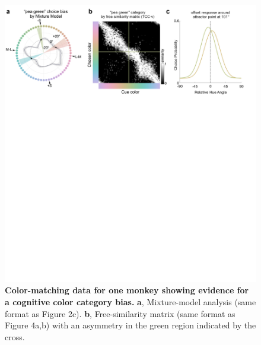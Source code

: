 \documentclass[9pt,biorxiv,lineno,onehalfspacing]{lapreprint}
\begin{document}
\begin{refsection}
\begin{figure}
    \begin{fullwidth}
    \centering
    \includegraphics[width=\textwidth+4cm,trim={0 18cm 0 0},clip]{Outputs/Paper/Figures/flat/F5_CastorCogBias_7.png}
    \caption{\textbf {Color-matching data for one monkey showing evidence for a cognitive color category bias.} 
    \textbf{a}, Mixture-model analysis (same format as Figure 2c). 
	\textbf{b}, Free-similarity matrix (same format as Figure 4a,b) with an asymmetry in the green region indicated by the cross.}
    \label{fig:IndiDataCogBias}
    \end{fullwidth}
\end{figure}


\end{refsection}
\end{document}
